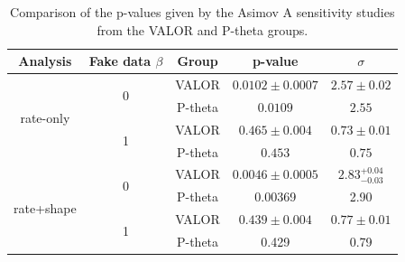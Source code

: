 \begin{table}[H]
\centering
\begin{tabular}{|c|c|c|c|c|}
	\hline
	Analysis                    & Fake data $\beta$   & Group                   & p-value              & $\sigma$                \\
	\hline
	
	
	\multirow{4}{*}{rate-only}  & \multirow{ 2}{*}{0} & VALOR                   & $0.0102 \pm 0.0007$  & $2.57 \pm 0.02$         \\
	\cline{3-5}
	                            &                     & P-theta                 & $0.0109$             & $2.55$                  \\
	\cline{2-5}
	                            & \multirow{ 2}{*}{1} & VALOR                   & $0.465 \pm 0.004$    & $0.73 \pm 0.01$         \\
	\cline{3-5}
	                            &                     & P-theta                 & $0.453$              & $0.75$                  \\
	\hline
	
	
	\multirow{4}{*}{rate+shape} & \multirow{ 2}{*}{0} & VALOR                   & $0.0046 \pm 0.0005$  & $2.83^{+0.04}_{-0.03}$  \\
	\cline{3-5}
	                            &                     & P-theta                 & 0.00369              & 2.90                    \\
	\cline{2-5}
	                            & \multirow{ 2}{*}{1} & VALOR                   & $0.439 \pm 0.004$    & $0.77 \pm 0.01$         \\
	\cline{3-5}
	                            &                     & P-theta                 & 0.429                & 0.79                    \\
	\hline
	
	
\end{tabular}
\caption{
	Comparison of the p-values given by the Asimov A sensitivity studies from the VALOR and P-theta groups.
}
\label{tab:compare_pvals_sensitivity_valor_ptheta}
\end{table}


